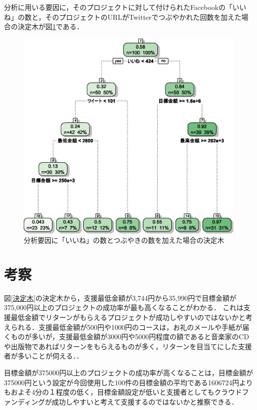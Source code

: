 \documentclass[uplatex,twocolumn]{jsarticle}
\begin{document}
分析に用いる要因に，そのプロジェクトに対して付けられたFacebookの「いいね」の数と，そのプロジェクトのURLがTwitterでつぶやかれた回数を加えた場合の決定木が図\ref{決定木2}である．

\begin{figure}[htb]
\includegraphics[width=\columnwidth,clip]{figure2.eps}
\caption{分析要因に「いいね」の数とつぶやきの数を加えた場合の決定木}\label{決定木2}
\end{figure}

\section{考察}

図\ref{決定木}の決定木から，支援最低金額が3,744円から35,990円で目標金額が375,000円以上のプロジェクトの成功率が最も高くなることがわかる．
これは支援最低金額でリターンがもらえるプロジェクトが成功しやすいのではないかと考えられる．支援最低金額が500円や1000円のコースは，お礼のメールや手紙が届くものが多いが，支援最低金額が3000円や5000円程度の額であると音楽家のCDや出版物であればリターンをもらえるものが多く，リターンを目当てにした支援者が多いことが伺える．．

目標金額が375000円以上のプロジェクトの成功率が高くなることは，目標金額が375000円という設定が今回使用した100件の目標金額の平均である1606724円よりもおよそ4分の１程度の低く，目標金額設定が低いと支援者としてもクラウドファンディングが成功しやすいと考えて支援するのではないかと推察できる．
\end{document}
